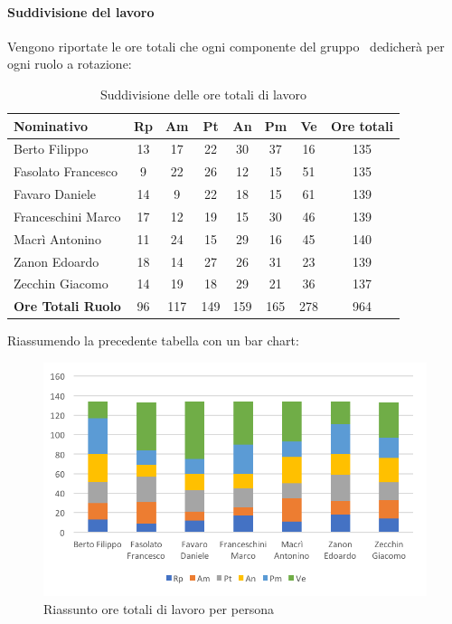 \documentclass[../PianoDiProgetto_v4.0.0.tex]{subfiles}
\begin{document}
			\paragraph{Suddivisione del lavoro}
			Vengono riportate le ore totali che ogni componente del gruppo \kpanic\ dedicherà per ogni ruolo a rotazione:
			\begin{table}[h]
				\begin{tabularx}{\textwidth}{l * {6}{C} c}
				\toprule
				\textbf{Nominativo} & \textbf{Rp} & \textbf{Am} & \textbf{Pt} & \textbf{An} & \textbf{Pm} & \textbf{Ve} & \textbf{Ore totali} \\
				\midrule
				Berto Filippo &	13 & 17 & 22 & 30 & 37 & 16 & 135 \\
				Fasolato Francesco & 9 & 22 & 26 & 12 & 15 & 51 & 135 \\
				Favaro Daniele & 14 & 9 & 22 & 18 & 15 & 61 & 139 \\
				Franceschini Marco & 17 & 12 & 19 & 15 & 30 & 46 & 139 \\
				Macrì Antonino & 11 & 24 & 15 & 29 & 16 & 45 & 140 \\
				Zanon Edoardo &	18 & 14 & 27 & 26 & 31 & 23 & 139 \\
				Zecchin Giacomo & 14 & 19 & 18 & 29 & 21 & 36 & 137 \\
				\midrule			
				\textbf{Ore Totali Ruolo} & 96 & 117 & 149 & 159 & 165 & 278 & 964 \\
				\bottomrule
				\end{tabularx}
				\caption{Suddivisione delle ore totali di lavoro}		
			\end{table}

			Riassumendo la precedente tabella con un bar chart:
			\begin{figure}[!h]
				\centering
				\includegraphics[width=\textwidth]{Preventivo/Immagini/totale_oreRuoloPersona.png}
				\caption{Riassunto ore totali di lavoro per persona}
			\end{figure}	
			
\end{document}
